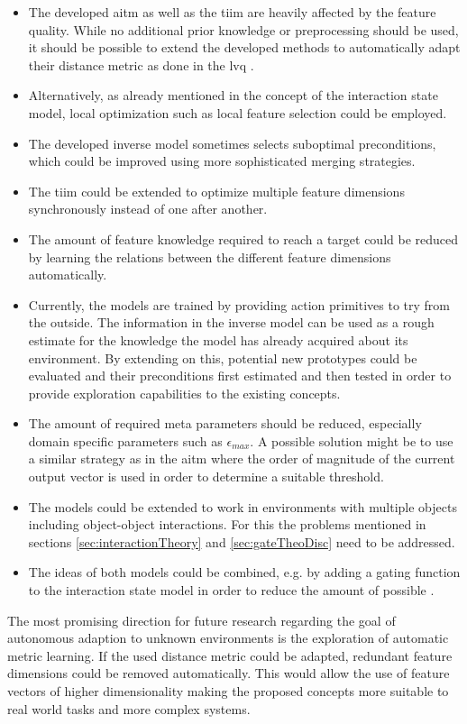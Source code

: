 \begin{itemize}
\item The developed \gls{aitm} as well as the \gls{tiim} are heavily affected by the feature quality. While no additional prior knowledge or preprocessing should be used, it should be possible to extend the developed methods to automatically adapt their distance metric as done in the \gls{lvq} \cite{lvq}.
\item Alternatively, as already mentioned in the concept of the interaction state model, local optimization such as local feature selection could be employed.
\item The developed inverse model sometimes selects suboptimal preconditions, which could be improved using more sophisticated merging strategies.
\item The \gls{tiim} could be extended to optimize multiple feature dimensions synchronously instead of one after another.
\item The amount of feature knowledge required to reach a target could be reduced by learning the relations between the different feature dimensions automatically.
\item Currently, the models are trained by providing action primitives to try from the outside. The information in the inverse model can be used as a rough estimate for the knowledge the model has already acquired about its environment. By extending on this, potential new prototypes could be evaluated and their preconditions first estimated and then tested in order to provide exploration capabilities to the existing concepts.
\item The amount of required meta parameters should be reduced, especially domain specific parameters such as $\epsilon_{max}$. A possible solution might be to use a similar strategy as in the \gls{aitm} where the order of magnitude of the current output vector is used in order to determine a suitable threshold.
\item The models could be extended to work in environments with multiple objects including object-object interactions. For this the problems mentioned in sections \ref{sec:interactionTheory} and \ref{sec:gateTheoDisc} need to be addressed.
\item The ideas of both models could be combined, e.g. by adding a gating function to the interaction state model in order to reduce the amount of possible .
\end{itemize}

The most promising direction for future research regarding the goal of autonomous adaption to unknown environments is the exploration of automatic metric learning. If the used distance metric could be adapted, redundant feature dimensions could be removed automatically. This would allow the use of feature vectors of higher dimensionality making the proposed concepts more suitable to real world tasks and more complex systems. 


